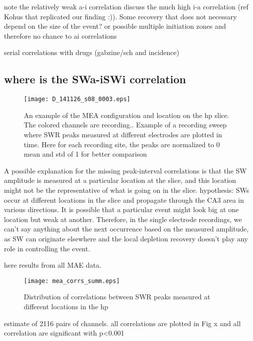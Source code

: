     note the relatively weak a-i correlation
    discuss the much high i-a correlation (ref Kohus that replicated our
    finding :)). Some recovery that does not necessary depend on the size of
    the event?  or possible multiple initiation zones and therefore no chance
    to ai correlations

    serial correlations with drugs (gabzine/sch and incidence) 

  \subsection{where is the SWa-iSWi correlation}

    \begin{figure}
      \texttt{[image: D\_141126\_s08\_0003.eps]}
      \caption{
        An example of the MEA configuration and location on the hp slice.  The
        colored channels are recording..  Example of a recording sweep where
        SWR peaks measured at different electrodes are plotted in time. Here
        for each recording site, the peaks are normalized to 0 mean and std of
        1 for better comparison
      }
      \label{fig:peak_correlation_ex}
    \end{figure}

    A possible explanation for the missing peak-interval correlations is that
    the SW amplitude is measured at a particular location at the slice, and
    this location might not be the representative of what is going on in the
    slice. hypothesis: SWs occur at different locations in the slice and
    propagate through the CA3 area in various directions. It is possible that a
    particular event might look big at one location but weak at another.
    Therefore, in the single electrode recordings, we can't say anything about
    the next occurrence based on the measured amplitude, as SW can originate
    elsewhere and the local depletion recovery doesn't play any role in
    controlling the event. 

    here results from all MAE data. 

    \begin{figure}
      \texttt{[image: mea\_corrs\_summ.eps]}
      \caption{
              Distribution of correlations between SWR peaks measured at
              different locations in the hp
             }
      \label{fig:peak_correlation_ex}
    \end{figure}

    estimate of 2116 pairs of channels. all correlations are plotted in Fig x
    and all correlation are significant with p<0.001

